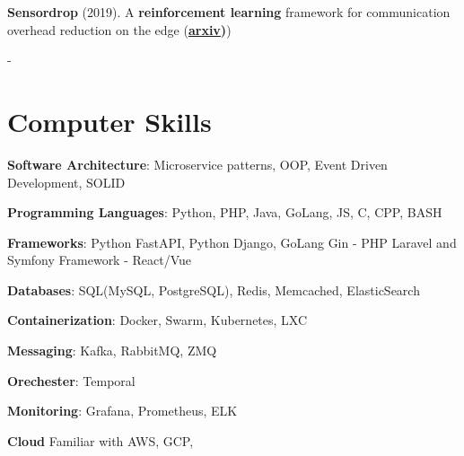 \documentclass[
	10pt, %
]{FreemanCV}
\begin{document}
\begin{paracol}{2}
\textbf{Sensordrop} (2019). A \textbf{reinforcement learning} framework for communication overhead reduction on the edge (\textbf{\href{https://arxiv.org/pdf/1910.01601.pdf}{arxiv})})

\medskip %

-

\section{Computer Skills} 



\begin{tightitemize}
			\vspace{2pt}
	\item{
		{\textbf{Software Architecture}: Microservice patterns, OOP, Event Driven Development, SOLID}

	}
		\vspace{2pt}
	\item{
		{\textbf{Programming Languages}: Python, PHP, Java, GoLang, JS, C, CPP, BASH}
	}
		\vspace{2pt}
	\item{
		{\textbf{Frameworks}: Python FastAPI, Python Django, GoLang Gin - PHP Laravel and Symfony Framework - React/Vue }
	}
		\vspace{2pt}
	\item{
		{\textbf{Databases}: SQL(MySQL, PostgreSQL), Redis, Memcached, ElasticSearch }
	}
		\vspace{2pt}
	\item{
		{\textbf{Containerization}: Docker, Swarm, Kubernetes, LXC }
	}
		\vspace{2pt}
	\item{
		{\textbf{Messaging}: Kafka, RabbitMQ, ZMQ}
	}
		\vspace{2pt}
\item{
	{\textbf{Orechester}: Temporal}
}
		\vspace{2pt}
\item{
	{\textbf{Monitoring}: Grafana, Prometheus, ELK}
}
	\vspace{2pt}
	\item{
		\textbf{Cloud} Familiar with AWS, GCP,
	}
\end{tightitemize}



\end{paracol} %

\end{document}
